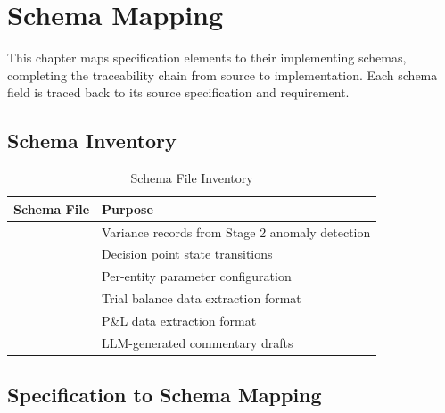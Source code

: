 \chapter{Schema Mapping}
\label{ch:schema-mapping}

This chapter maps specification elements to their implementing schemas,
completing the traceability chain from source to implementation. Each
schema field is traced back to its source specification and requirement.

\section{Schema Inventory}
\label{sec:schema-inventory}

\begin{table}[h]
\centering
\caption{Schema File Inventory}
\label{tab:schema-inventory}
\begin{tabularx}{\textwidth}{@{}L{5cm}L{9cm}@{}}
\toprule
\textbf{Schema File} & \textbf{Purpose} \\
\midrule
{} & Variance records from Stage 2 anomaly detection \\
 & Decision point state transitions \\
 & Per-entity parameter configuration \\
 & Trial balance data extraction format \\
 & P\&L data extraction format \\
 & LLM-generated commentary drafts \\
\bottomrule
\end{tabularx}
\end{table}

\section{Specification to Schema Mapping}
\label{sec:spec-schema-mapping}

